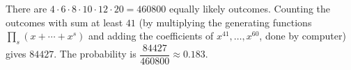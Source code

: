 There are $4\cdot6\cdot8\cdot10\cdot12\cdot20=460800$ equally likely outcomes. Counting the outcomes with sum at least $41$ (by multiplying the generating functions $\prod_s(x+\cdots+x^s)$ and adding the coefficients of $x^{41},\dots,x^{60}$, done by computer) gives $84427$. The probability is $\boxed{\dfrac{84427}{460800}}\approx0.183$.
